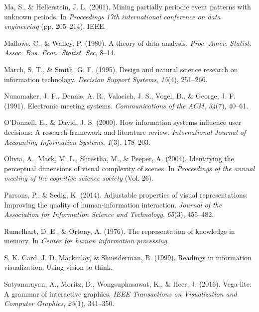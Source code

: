\documentclass[print]{nuthesis}
\newlength{\cslhangindent}
\newenvironment{CSLReferences}[2]%
{\setlength{\parindent}{0pt}%
\everypar{\setlength{\hangindent}{\cslhangindent}}\ignorespaces}%
{\par}
\begin{document}
\begin{CSLReferences}{1}{0}
\leavevmode\hypertarget{ref-ma2001}{}%
Ma, S., \& Hellerstein, J. L. (2001). Mining partially periodic event patterns with unknown periods. In \emph{Proceedings 17th international conference on data engineering} (pp. 205--214). IEEE.

\leavevmode\hypertarget{ref-mallows1980}{}%
Mallows, C., \& Walley, P. (1980). A theory of data analysis. \emph{Proc. Amer. Statist. Assoc. Bus. Econ. Statist. Sec}, 8--14.

\leavevmode\hypertarget{ref-march1995}{}%
March, S. T., \& Smith, G. F. (1995). Design and natural science research on information technology. \emph{Decision Support Systems}, \emph{15}(4), 251--266.

\leavevmode\hypertarget{ref-nunamaker1991}{}%
Nunamaker, J. F., Dennis, A. R., Valacich, J. S., Vogel, D., \& George, J. F. (1991). Electronic meeting systems. \emph{Communications of the ACM}, \emph{34}(7), 40--61.

\leavevmode\hypertarget{ref-odonnell2000}{}%
O'Donnell, E., \& David, J. S. (2000). How information systems influence user decisions: A research framework and literature review. \emph{International Journal of Accounting Information Systems}, \emph{1}(3), 178--203.

\leavevmode\hypertarget{ref-olivia2004}{}%
Olivia, A., Mack, M. L., Shrestha, M., \& Peeper, A. (2004). Identifying the perceptual dimensions of visual complexity of scenes. In \emph{Proceedings of the annual meeting of the cognitive science society} (Vol. 26).

\leavevmode\hypertarget{ref-parsons2014}{}%
Parsons, P., \& Sedig, K. (2014). Adjustable properties of visual representations: Improving the quality of human-information interaction. \emph{Journal of the Association for Information Science and Technology}, \emph{65}(3), 455--482.

\leavevmode\hypertarget{ref-rumelhart1976}{}%
Rumelhart, D. E., \& Ortony, A. (1976). The representation of knowledge in memory. In \emph{Center for human information processing}.

\leavevmode\hypertarget{ref-Card}{}%
S. K. Card, J. D. Mackinlay, \& Shneiderman, B. (1999). Readings in information visualization: Using vision to think.

\leavevmode\hypertarget{ref-satyanarayan2016}{}%
Satyanarayan, A., Moritz, D., Wongsuphasawat, K., \& Heer, J. (2016). Vega-lite: A grammar of interactive graphics. \emph{IEEE Transactions on Visualization and Computer Graphics}, \emph{23}(1), 341--350.


\end{CSLReferences}
\end{document}
